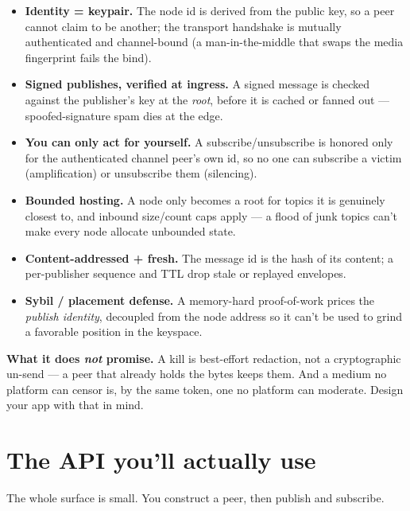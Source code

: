 \documentclass[nobib]{tufte-handout}
\begin{document}
\begin{itemize}
\item \textbf{Identity = keypair.} The node id is derived from the public key, so
a peer cannot claim to be another; the transport handshake is mutually
authenticated and channel-bound (a man-in-the-middle that swaps the media
fingerprint fails the bind).
\item \textbf{Signed publishes, verified at ingress.} A signed message is
checked against the publisher's key at the \emph{root}, before it is cached or
fanned out --- spoofed-signature spam dies at the edge.
\item \textbf{You can only act for yourself.} A subscribe/unsubscribe is honored
only for the authenticated channel peer's own id, so no one can subscribe a
victim (amplification) or unsubscribe them (silencing).
\item \textbf{Bounded hosting.} A node only becomes a root for topics it is
genuinely closest to, and inbound size/count caps apply --- a flood of junk
topics can't make every node allocate unbounded state.
\item \textbf{Content-addressed + fresh.} The message id is the hash of its
content; a per-publisher sequence and TTL drop stale or replayed envelopes.
\item \textbf{Sybil / placement defense.} A memory-hard proof-of-work prices the
\emph{publish identity}, decoupled from the node address so it can't be used to
grind a favorable position in the keyspace.
\end{itemize}

\noindent\textbf{What it does \emph{not} promise.} A kill is best-effort
redaction, not a cryptographic un-send --- a peer that already holds the bytes
keeps them. And a medium no platform can censor is, by the same token, one no
platform can moderate. Design your app with that in mind.

\section{The API you'll actually use}

The whole surface is small. You construct a peer, then publish and subscribe.
\end{document}
